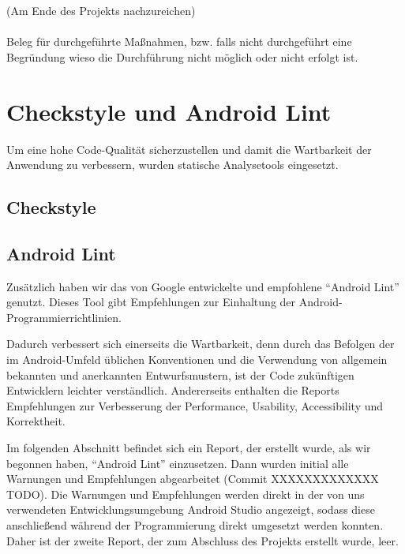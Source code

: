 
    (Am Ende des Projekts nachzureichen)\\\\
    Beleg für durchgeführte Maßnahmen, bzw. falls nicht durchgeführt eine Begründung wieso die Durchführung nicht möglich oder nicht erfolgt ist. \\



\clearpage

\section{Checkstyle und Android Lint}

Um eine hohe Code-Qualität sicherzustellen und damit die Wartbarkeit der
Anwendung zu verbessern, wurden statische Analysetools eingesetzt.

\clearpage
\subsection{Checkstyle}


\clearpage
\subsection{Android Lint}

Zusätzlich haben wir das von Google entwickelte und empfohlene ``Android Lint''
genutzt. Dieses Tool gibt Empfehlungen zur Einhaltung der Android-Programmierrichtlinien.

Dadurch verbessert sich einerseits die Wartbarkeit, denn durch das Befolgen der im Android-Umfeld üblichen
 Konventionen und die Verwendung von allgemein bekannten und anerkannten Entwurfsmustern, ist der Code zukünftigen
Entwicklern leichter verständlich.
Andererseits enthalten die Reports Empfehlungen zur Verbesserung der Performance, Usability, Accessibility und Korrektheit.

Im folgenden Abschnitt befindet sich ein Report, der erstellt wurde,
als wir begonnen haben, ``Android Lint'' einzusetzen. Dann wurden initial alle
Warnungen und Empfehlungen abgearbeitet (Commit XXXXXXXXXXXXX TODO).
Die Warnungen und Empfehlungen werden direkt in der von uns verwendeten
Entwicklungsumgebung Android Studio angezeigt, sodass diese anschließend während
der Programmierung direkt umgesetzt werden konnten. Daher ist der zweite Report,
der zum Abschluss des Projekts erstellt wurde, leer.





